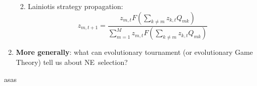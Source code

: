 \documentclass{article}%
\numberwithin{equation}{section}
\begin{document}
\begin{enumerate}
\begin{enumerate}
\begin{enumerate}
\end{enumerate}

\item Lainiotis strategy propagation:%
\[
z_{m,t+1}=\frac{z_{m,t}F\left(  \sum_{k\neq m}z_{k,t}Q_{mk}\right)  }%
{\sum_{m=1}^{M}z_{m,t}F\left(  \sum_{k\neq m}z_{k,t}Q_{mk}\right)  }%
\]

\end{enumerate}

\item \textbf{More generally}: what can evolutionary tournament (or
evolutionary Game Theory) tell us about NE\ selection?
\end{enumerate}

asas
\end{document}
